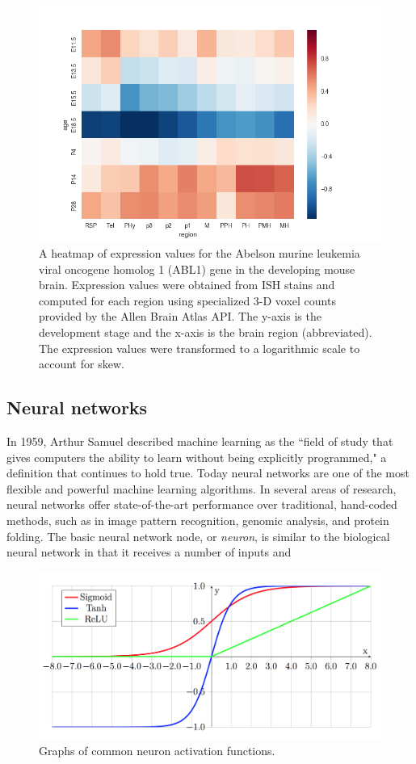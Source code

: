 \documentclass[12pt,oneside,onecolumn,a4paper]{article}
\begin{document}
\begin{figure}[h!]
\begin{center}
\includegraphics[width=0.8\columnwidth]{figures/Abl1/Abl1}
\caption{A heatmap of expression values for the Abelson murine leukemia viral oncogene homolog 1 (ABL1) gene in the developing mouse brain. Expression values were obtained from ISH stains and computed for each region using specialized 3-D voxel counts provided by the Allen Brain Atlas API. The y-axis is the development stage and the x-axis is the brain region (abbreviated). The expression values were transformed to a logarithmic scale to account for skew.%
}
\end{center}
\end{figure}

\subsection{Neural networks}
In 1959, Arthur Samuel described machine learning as the ``field of study that gives computers the ability to learn without being
explicitly programmed," a definition that continues to hold true. Today neural networks are one of the most flexible and powerful machine learning algorithms. In several areas of research, neural networks offer state-of-the-art performance over traditional, hand-coded methods, such as in image pattern recognition, genomic analysis, and protein folding. The basic neural network node, or \textit{neuron}, is similar to the biological neural network in that it receives a number of inputs and 
\begin{figure}[H]
\begin{center}
\includegraphics[width=0.8\columnwidth]{figures/activations}
\caption{Graphs of common neuron activation functions.\label{fig:activations}}
\end{center}
\end{figure}
\end{document}
